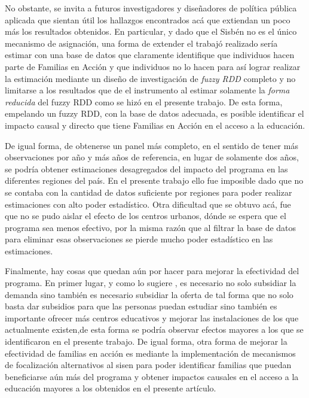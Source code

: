 \documentclass[AER]{AEA}
\begin{document}

No obstante, se invita a futuros investigadores y diseñadores de política pública aplicada que sientan útil los hallazgos encontrados acá que extiendan un poco más los resultados obtenidos. En particular, y dado que el Sisbén no es el único mecanismo de asignación, una forma de extender el trabajó realizado sería estimar con una base de datos que claramente identifique que individuos hacen parte de Familias en Acción y que individuos no lo hacen para así lograr realizar la estimación mediante un diseño de investigación de \textit{fuzzy RDD} completo y no limitarse a los resultados que de el instrumento al estimar solamente la \textit{forma reducida} del fuzzy RDD como se hizó en el presente trabajo. De esta forma, empelando un fuzzy RDD, con la base de datos adecuada, es posible identificar el impacto causal y directo que tiene Familias en Acción en el acceso a la educación. 

De igual forma, de obtenerse un panel más completo, en el sentido de tener más observaciones por año y más años de referencia, en lugar de solamente dos años, se podría obtener estimaciones desagregados del impacto del programa en las diferentes regiones del país. En el presente trabajo ello fue imposible dado que no se contaba con la cantidad de datos suficiente por regiones para poder realizar estimaciones con alto poder estadístico. Otra dificultad que se obtuvo acá, fue que no se pudo aislar el efecto de los centros urbanos, dónde se espera que el programa sea menos efectivo, por la misma razón que al filtrar la base de datos para eliminar esas observaciones se pierde mucho poder estadístico en las estimaciones.



Finalmente, hay cosas que quedan aún por hacer para mejorar la efectividad del programa. En primer lugar, y como lo sugiere \cite{Robles2018Las2001-2018}, es necesario no solo subsidiar la demanda sino también es necesario subsidiar la oferta de tal forma que no solo basta dar subsidios para que las personas puedan estudiar sino también es importante ofrecer más centros educativos y mejorar las instalaciones de los que actualmente existen,de esta forma se podría observar efectos mayores a los que se identificaron en el presente trabajo. De igual forma, otra forma de mejorar la efectividad de familias en acción es mediante la implementación de mecanismos de focalización alternativos al sisen para poder identificar familias que puedan beneficiarse aún más del programa y obtener impactos causales en el acceso a la educación mayores a los obtenidos en el presente artículo.
\end{document}
